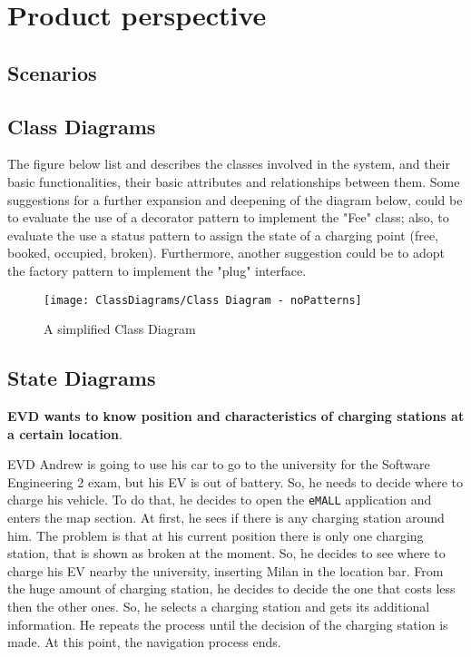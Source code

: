 \section{Product perspective}\label{sec:product_perspective}
\subsection{Scenarios}\label{subsec:scenarios}
\subsection{Class Diagrams}\label{subsec:class-diagrams}
The figure below list and describes the classes involved in the system, and their basic functionalities, their basic attributes and relationships between them. Some suggestions for a further expansion and deepening of the diagram below, could be to evaluate the use of a decorator pattern to implement the "Fee" class; also, to evaluate the use a status pattern to assign the state of a charging point (free, booked, occupied, broken). Furthermore, another suggestion could be to adopt the factory pattern to implement the "plug" interface.
\begin{figure}[H]
	\centering
	\texttt{[image: ClassDiagrams/Class Diagram - noPatterns]}
	\caption{A simplified Class Diagram}
	\label{fig: class_diagram}
\end{figure}
\subsection{State Diagrams}\label{subsec:state-diagrams}
\textbf{EVD wants to know position and characteristics of charging stations at a certain location}.

EVD Andrew is going to use his car to go to the university for the Software Engineering 2 exam, but his EV is out of battery.
So, he needs to decide where to charge his vehicle.
To do that, he decides to open the \verb|eMALL| application and enters the map section.
At first, he sees if there is any charging station around him.
The problem is that at his current position there is only one charging station, that is shown as broken at the moment.
So, he decides to see where to charge his EV nearby the university, inserting Milan in the location bar.
From the huge amount of charging station, he decides to decide the one that costs less then the other ones.
So, he selects a charging station and gets its additional information.
He repeats the process until the decision of the charging station is made.
At this point, the navigation process ends.

